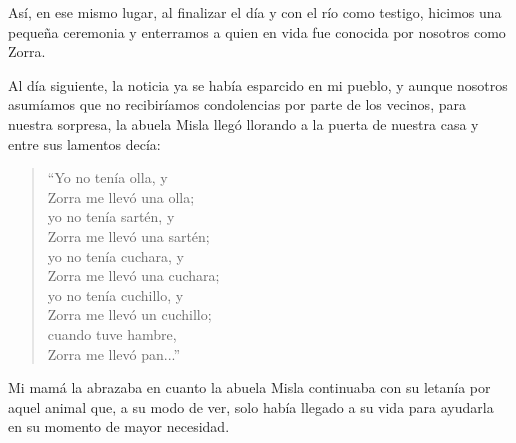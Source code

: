 Así, en ese mismo lugar, al finalizar el día y con el río como testigo, hicimos una pequeña ceremonia y enterramos a quien en vida fue conocida por nosotros como Zorra.

Al día siguiente, la noticia ya se había esparcido en mi pueblo, y aunque nosotros asumíamos que no recibiríamos condolencias por parte de los vecinos, para nuestra sorpresa, la abuela Misla llegó llorando a la puerta de nuestra casa y entre sus lamentos decía:
\begin{quotation}
\noindent ``Yo no tenía olla, y \\Zorra me llevó una olla;\\ 
yo no tenía sartén, y \\Zorra me llevó una sartén;\\ 
yo no tenía cuchara, y \\Zorra me llevó una cuchara;\\
yo no tenía cuchillo, y \\Zorra me llevó un cuchillo;\\
cuando tuve hambre, \\Zorra me llevó pan...''
\end{quotation}
Mi mamá la abrazaba en cuanto la abuela Misla continuaba con su letanía por aquel animal que, a su modo de ver, solo había llegado a su vida para ayudarla en su momento de mayor necesidad.

